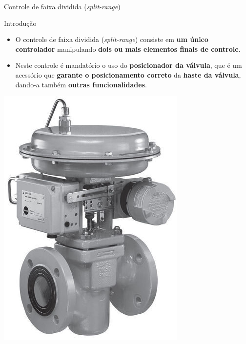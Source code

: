%	
%	


\begin{frame}{Controle de faixa dividida (\textit{split-range})}
	\begin{block}{Introdução}
		\begin{itemize}
			\item O controle de faixa dividida (\textit{split-range}) consiste em \textbf{um único controlador} manipulando \textbf{dois ou mais elementos finais de controle}.
			\item Neste controle é mandatório o uso do \textbf{posicionador da válvula}, que é um acessório que \textbf{garante o posicionamento correto} da \textbf{haste da válvula}, dando-a também \textbf{outras funcionalidades}.
		\end{itemize}
	\end{block}

	\centering
	\includegraphics[height=0.45\textheight]{Figuras/Ch15/fig15}
\end{frame}


